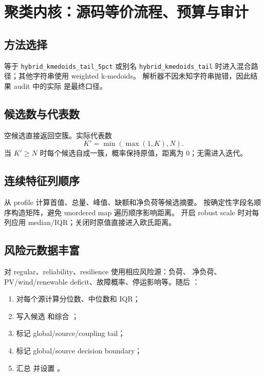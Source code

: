 \section{聚类内核：源码等价流程、预算与审计}
\label{sec:clustering-implementation}

\subsection{方法选择}
 等于 \texttt{hybrid\_kmedoids\_tail\_5pct} 或别名
\texttt{hybrid\_kmedoids\_tail} 时进入混合路径；其他字符串使用 weighted k-medoids。
解析器不因未知字符串抛错，因此结果 audit 中的实际  是最终口径。

\subsection{候选数与代表数}
空候选直接返回空簇。实际代表数
\begin{equation}
 K'=\min(\max(1,K),N).
\end{equation}
当 $K'\ge N$ 时每个候选自成一簇，概率保持原值，距离为 0；无需进入迭代。

\subsection{连续特征列顺序}
 从 profile 计算首值、总量、峰值、缺额和净负荷等候选摘要。
 按确定性字段名顺序构造矩阵，避免 unordered map 遍历顺序影响距离。
开启 robust scale 时对每列应用 median/IQR；关闭时原值直接进入欧氏距离。

\subsection{风险元数据丰富}
 对 regular、reliability、resilience 使用相应风险源：负荷、
净负荷、PV/wind/renewable deficit、故障概率、停运影响等。随后
：
\begin{enumerate}
  \item 对每个源计算分位数、中位数和 IQR；
  \item 写入候选  和综合 ；
  \item 标记 global/source/coupling tail；
  \item 标记 global/source decision boundary；
  \item 汇总  并设置 。
\end{enumerate}

